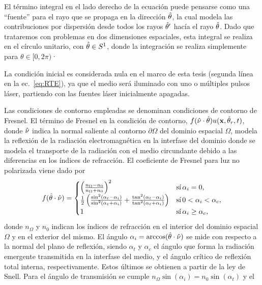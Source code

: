 El término integral en el lado derecho de la ecuación 
puede pensarse como una ``fuente'' para el rayo que se propaga en la dirección $\hat{\theta}$, 
la cual modela las contribuciones por dispersión desde todos los rayos $\hat{\theta}'$ 
hacía el rayo $\hat{\theta}$. Dado que trataremos con problemas en dos dimensiones espaciales, 
esta integral se realiza en el círculo unitario, con $\hat{\theta} \in S^1$, 
donde la integración se realiza simplemente para $\theta \in [0,2\pi)$·

La condición inicial es considerada nula en el marco de esta tesis 
(segunda línea en la ec.~\eqref{eq:RTE}), ya 
que el medio será iluminado con uno o múltiples pulsos láser, partiendo con las 
fuentes láser inicialmente apagadas. 

Las condiciones de contorno empleadas se denominan condiciones de contorno de Fresnel. 
El término de Fresnel en la condición de contorno, $f(\hat{\nu} \cdot \hat{\theta}) u(\mathbf{x},\hat{\theta}_r,t)$, 
donde $\hat{\nu}$ indica la normal saliente al contorno $\partial \Omega$ del dominio espacial 
$\Omega$, 
modela la reflexión de la radiación electromagnética 
en la interfase del dominio donde se modela el transporte de la radiación 
con el medio circundante debido a las diferencias 
en los índices de refracción. El coeficiente de Fresnel para luz no polarizada viene dado por~\cite{Born1999}
\begin{equation}
f(\hat{\theta} \cdot \hat{\nu}) =
     \begin{cases}
      \left( \frac{n_{\Omega}-n_0}{n_{\Omega}+n_0} \right)^2  & \text{sí} \, \alpha_i = 0, \\
       \frac{1}{2}\left(\frac{\sin^2(\alpha_t-\alpha_i)}{\sin^2(\alpha_t+
       \alpha_i)}+\frac{\tan^2(\alpha_t-\alpha_i)}{\tan^2(\alpha_t+\alpha_i)}\right) & 
       \text{sí} \, 0<\alpha_i < \alpha_c, \\
      1  & \text{sí} \, \alpha_i \ge \alpha_c, \\
     \end{cases}
\end{equation}
donde $n_\Omega$ y $n_0$ indican los índices de refracción en el interior 
del dominio espacial $\Omega$ y en el exterior del mismo. El ángulo $\alpha_i=\arccos(\hat{\theta} \cdot \hat{\nu})$ 
se mide con respecto a la normal del plano de reflexión, siendo $\alpha_t$ y $\alpha_c$ 
el ángulo que forma la radiación emergente transmitida en la interfase del medio, y el ángulo 
crítico de reflexión total interna, respectivamente. Estos últimos se obtienen a partir de la ley de Snell. 
Para el ángulo de transmisión se cumple $n_{\Omega} \sin(\alpha_i)=n_0 \sin (\alpha_t)$ y el 
